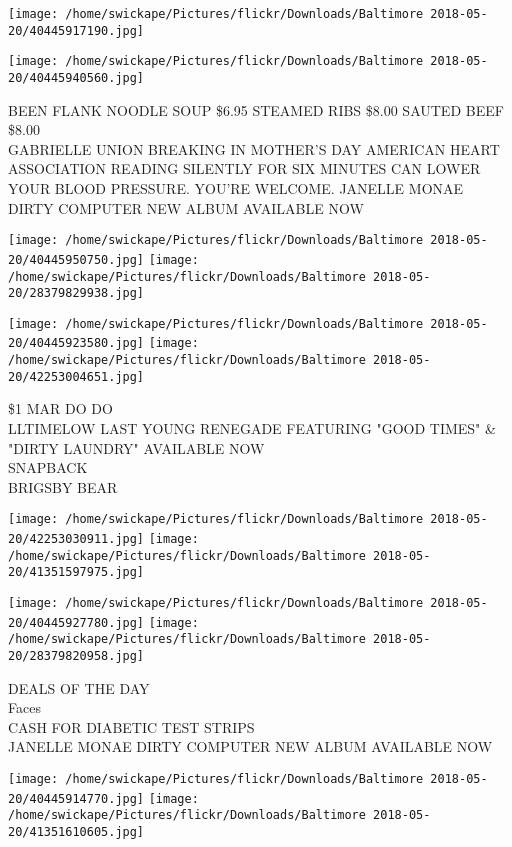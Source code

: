 \documentclass[10pt,letterpaper]{article}
\begin{document}
\texttt{[image: /home/swickape/Pictures/flickr/Downloads/Baltimore 2018-05-20/40445917190.jpg]}

\vspace{0.25in}
\texttt{[image: /home/swickape/Pictures/flickr/Downloads/Baltimore 2018-05-20/40445940560.jpg]}

BEEN FLANK NOODLE SOUP \$6.95 STEAMED RIBS \$8.00 SAUTED BEEF \$8.00\\
GABRIELLE UNION BREAKING IN MOTHER'S DAY AMERICAN HEART ASSOCIATION READING SILENTLY FOR SIX MINUTES CAN LOWER YOUR BLOOD PRESSURE.  YOU'RE WELCOME. JANELLE MONAE DIRTY COMPUTER NEW ALBUM AVAILABLE NOW
\pagebreak

\texttt{[image: /home/swickape/Pictures/flickr/Downloads/Baltimore 2018-05-20/40445950750.jpg]}
\texttt{[image: /home/swickape/Pictures/flickr/Downloads/Baltimore 2018-05-20/28379829938.jpg]}

\texttt{[image: /home/swickape/Pictures/flickr/Downloads/Baltimore 2018-05-20/40445923580.jpg]}
\texttt{[image: /home/swickape/Pictures/flickr/Downloads/Baltimore 2018-05-20/42253004651.jpg]}

\$1 MAR DO DO\\
LLTIMELOW LAST YOUNG RENEGADE FEATURING "GOOD TIMES" \& "DIRTY LAUNDRY" AVAILABLE NOW\\
SNAPBACK\\
BRIGSBY BEAR
\pagebreak

\texttt{[image: /home/swickape/Pictures/flickr/Downloads/Baltimore 2018-05-20/42253030911.jpg]}
\texttt{[image: /home/swickape/Pictures/flickr/Downloads/Baltimore 2018-05-20/41351597975.jpg]}

\texttt{[image: /home/swickape/Pictures/flickr/Downloads/Baltimore 2018-05-20/40445927780.jpg]}
\texttt{[image: /home/swickape/Pictures/flickr/Downloads/Baltimore 2018-05-20/28379820958.jpg]}

DEALS OF THE DAY\\
Faces\\
CASH FOR DIABETIC TEST STRIPS\\
JANELLE MONAE DIRTY COMPUTER NEW ALBUM AVAILABLE NOW
\pagebreak

\texttt{[image: /home/swickape/Pictures/flickr/Downloads/Baltimore 2018-05-20/40445914770.jpg]}
\texttt{[image: /home/swickape/Pictures/flickr/Downloads/Baltimore 2018-05-20/41351610605.jpg]}
\end{document}

